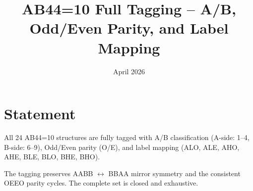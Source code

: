 \documentclass{article}
\title{AB44=10 Full Tagging -- A/B, Odd/Even Parity, and Label Mapping}
\date{April 2026}
\begin{document}
\maketitle

\section{Statement}

All 24 AB44=10 structures are fully tagged with A/B classification (A-side: 1--4, B-side: 6--9), Odd/Even parity (O/E), and label mapping (ALO, ALE, AHO, AHE, BLE, BLO, BHE, BHO).

The tagging preserves AABB $\leftrightarrow$ BBAA mirror symmetry and the consistent OEEO parity cycles. The complete set is closed and exhaustive.
\end{document}
